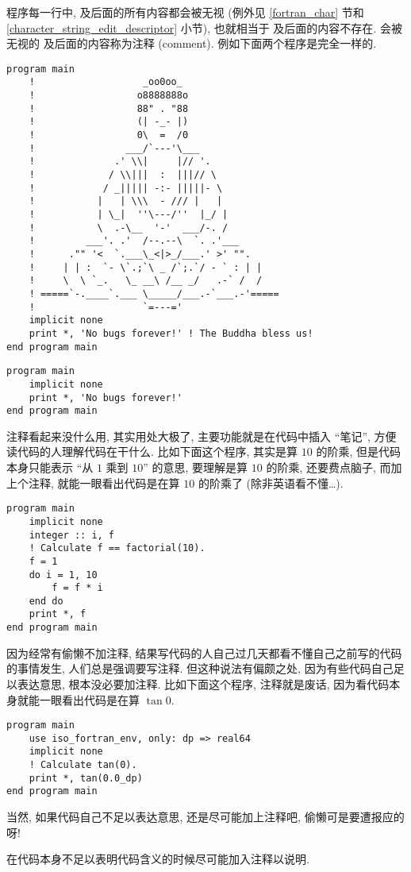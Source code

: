 程序每一行中, \ttt{!} 及后面的所有内容都会被无视 (例外见 \ref{fortran_char} 节和 \ref{character_string_edit_descriptor} 小节), 也就相当于 \ttt{!} 及后面的内容不存在. 会被无视的 \ttt{!} 及后面的内容称为注释 (comment). 例如下面两个程序是完全一样的.
\begin{lstlisting}
program main
    !                   _oo0oo_
    !                  o8888888o
    !                  88" . "88
    !                  (| -_- |)
    !                  0\  =  /0
    !                ___/`---'\___
    !              .' \\|     |// '.
    !             / \\|||  :  |||// \
    !            / _||||| -:- |||||- \
    !           |   | \\\  - /// |   |
    !           | \_|  ''\---/''  |_/ |
    !           \  .-\__  '-'  ___/-. /
    !         ___'. .'  /--.--\  `. .'___
    !      ."" '<  `.___\_<|>_/___.' >' "".
    !     | | :  `- \`.;`\ _ /`;.`/ - ` : | |
    !     \  \ `_.   \_ __\ /__ _/   .-` /  /
    ! =====`-.____`.___ \_____/___.-`___.-'=====
    !                   `=---='
    implicit none
    print *, 'No bugs forever!' ! The Buddha bless us!
end program main
\end{lstlisting}
\begin{lstlisting}
program main
    implicit none
    print *, 'No bugs forever!'
end program main
\end{lstlisting}

注释看起来没什么用, 其实用处大极了, 主要功能就是在代码中插入 ``笔记'', 方便读代码的人理解代码在干什么. 比如下面这个程序, 其实是算 $10$ 的阶乘, 但是代码本身只能表示 ``从 $1$ 乘到 $10$'' 的意思, 要理解是算 $10$ 的阶乘, 还要费点脑子, 而加上个注释, 就能一眼看出代码是在算 $10$ 的阶乘了 (除非英语看不懂\dots{}).
\begin{lstlisting}
program main
    implicit none
    integer :: i, f
    ! Calculate f == factorial(10).
    f = 1
    do i = 1, 10
        f = f * i
    end do
    print *, f
end program main
\end{lstlisting}

因为经常有偷懒不加注释, 结果写代码的人自己过几天都看不懂自己之前写的代码的事情发生, 人们总是强调要写注释. 但这种说法有偏颇之处, 因为有些代码自己足以表达意思, 根本没必要加注释. 比如下面这个程序, 注释就是废话, 因为看代码本身就能一眼看出代码是在算 $\tan 0$.
\begin{lstlisting}
program main
    use iso_fortran_env, only: dp => real64
    implicit none
    ! Calculate tan(0).
    print *, tan(0.0_dp)
end program main
\end{lstlisting}
当然, 如果代码自己不足以表达意思, 还是尽可能加上注释吧, 偷懒可是要遭报应的呀!
\begin{convention}
    在代码本身不足以表明代码含义的时候尽可能加入注释以说明.
\end{convention}


